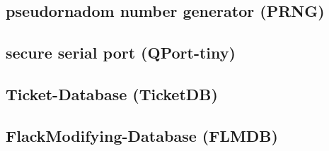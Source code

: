 
\subsection{pseudornadom number generator (PRNG)}


\subsection{secure serial port (QPort-tiny)}


\subsection{Ticket-Database (TicketDB)}


\subsection{FlackModifying-Database (FLMDB)}




